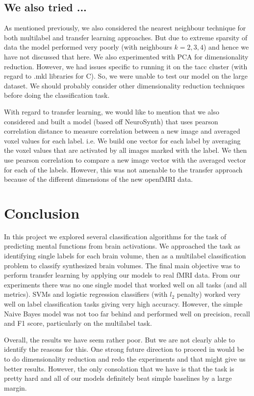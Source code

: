 \documentclass{article} %
\begin{document}
\subsection{We also tried ...}
As mentioned previously, we also considered the nearest neighbour technique for both multilabel and transfer learning approaches. But due to extreme sparsity of data the model performed very poorly (with neighbours $k=2,3,4$) and hence we have not discussed that here. We also experimented with PCA for dimensionality reduction. However, we had issues specific to running it on the tacc cluster (with regard to .mkl libraries for C). So, we were unable to test our model on the large dataset. We should probably consider other dimensionality reduction techniques before doing the classification task.

With regard to transfer learning, we would like to mention that we also considered and built a model (based off NeuroSynth) that uses pearson correlation distance to measure correlation between a new image and averaged voxel values for each label. i.e. We build one vector for each label by averaging the voxel values that are activated by all images marked with the label. We then use pearson correlation to compare a new image vector with the averaged vector for each of the labels. However, this was not amenable to the transfer approach because of the different dimensions of the new openfMRI data. 

\section{Conclusion}
In this project we explored several classification algorithms for the task of predicting mental functions from brain activations. We approached the task as identifying single labels for each brain volume, then as a multilabel classification problem to classify synthesized brain volumes. The final main objective was to perform transfer learning by applying our models to real fMRI data. From our experiments there was no one single model that worked well on all tasks (and all metrics). SVMs and logistic regression classifiers (with $l_2$ penalty) worked very well on label classification tasks giving very high accuracy. However, the simple Naive Bayes model was not too far behind and performed well on precision, recall and F1 score, particularly on the multilabel task.

Overall, the results we have seem rather poor. But we are not clearly able to identify the reasons for this. One strong future direction to proceed in would be to do dimensionality reduction and redo the experiments and that might give us better results. However, the only consolation that we have is that the task is pretty hard and all of our models definitely beat simple baselines by a large margin.
\end{document}
